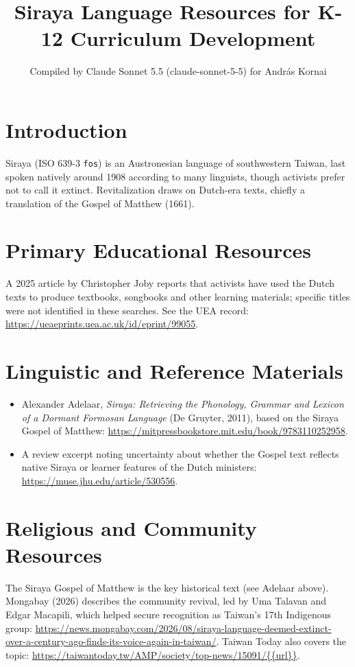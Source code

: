 \documentclass[12pt]{article}
\title{Siraya Language Resources for K-12 Curriculum Development}
\author{Compiled by Claude Sonnet 5.5 (claude-sonnet-5-5) for Andr\'as Kornai}
\date{}
\begin{document}
\maketitle

\section{Introduction}
Siraya (ISO 639-3 \texttt{fos}) is an Austronesian language of southwestern Taiwan, last spoken natively around 1908 according to many linguists, though activists prefer not to call it extinct. Revitalization draws on Dutch-era texts, chiefly a translation of the Gospel of Matthew (1661).

\section{Primary Educational Resources}
A 2025 article by Christopher Joby reports that activists have used the Dutch texts to produce textbooks, songbooks and other learning materials; specific titles were not identified in these searches. See the UEA record: \url{https://ueaeprints.uea.ac.uk/id/eprint/99055}.

\section{Linguistic and Reference Materials}
\begin{itemize}
\item Alexander Adelaar, \emph{Siraya: Retrieving the Phonology, Grammar and Lexicon of a Dormant Formosan Language} (De Gruyter, 2011), based on the Siraya Gospel of Matthew: \url{https://mitpressbookstore.mit.edu/book/9783110252958}.
\item A review excerpt noting uncertainty about whether the Gospel text reflects native Siraya or learner features of the Dutch ministers: \url{https://muse.jhu.edu/article/530556}.
\end{itemize}

\section{Religious and Community Resources}
The Siraya Gospel of Matthew is the key historical text (see Adelaar above). Mongabay (2026) describes the community revival, led by Uma Talavan and Edgar Macapili, which helped secure recognition as Taiwan's 17th Indigenous group: \url{https://news.mongabay.com/2026/08/siraya-language-deemed-extinct-over-a-century-ago-finds-its-voice-again-in-taiwan/}. Taiwan Today also covers the topic: \url{https://taiwantoday.tw/AMP/society/top-news/15091/{{url}}}.
\end{document}
